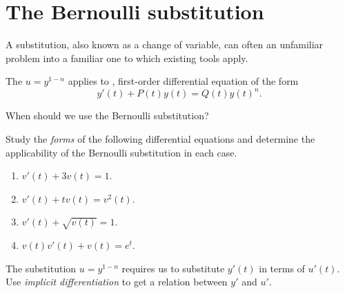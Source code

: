 \documentclass[../main.tex]{subfiles}
\begin{document}
 \section{The Bernoulli substitution}

A substitution, also known as a change of variable, can often  an unfamiliar problem into a familiar one to which existing tools apply. 

\begin{method} \label{method:bernoulli-sub}
  The  \(u = y^{1-n}\) applies to , first-order differential equation of the form
  \begin{equation} \label{eq:bernoulli}
    y'(t) + P(t) y(t) = Q(t) y(t)^{n}.
  \end{equation}
\end{method}

\begin{example}
  When should we use the Bernoulli substitution?

  Study the \emph{forms} of the following differential equations and determine the applicability of the Bernoulli substitution in each case. 
  
  \begin{enumerate}[label=(\alph*)]
    \item \(v'(t) + 3v(t) = 1\).
    \item \(v'(t) + t v(t) = v^{2}(t)\).
    \item \(v'(t) + \sqrt{v(t)} = 1\).
    \item \(v(t) v'(t) + v(t) = e^{t}\).
  \end{enumerate}
\end{example}

\faStar{} The substitution \(u = y^{1-n}\) requires us to substitute \(y'(t)\) in terms of \(u'(t)\). Use \emph{implicit differentiation} to get a relation between \(y'\) and \(u'\).
\clearpage
\end{document}
